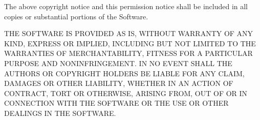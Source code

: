 The above copyright notice and this permission notice shall be included in all copies or substantial portions of the Software.

T\+HE S\+O\+F\+T\+W\+A\+RE IS P\+R\+O\+V\+I\+D\+ED \textquotesingle{}AS IS\textquotesingle{}, W\+I\+T\+H\+O\+UT W\+A\+R\+R\+A\+N\+TY OF A\+NY K\+I\+ND, E\+X\+P\+R\+E\+SS OR I\+M\+P\+L\+I\+ED, I\+N\+C\+L\+U\+D\+I\+NG B\+UT N\+OT L\+I\+M\+I\+T\+ED TO T\+HE W\+A\+R\+R\+A\+N\+T\+I\+ES OF M\+E\+R\+C\+H\+A\+N\+T\+A\+B\+I\+L\+I\+TY, F\+I\+T\+N\+E\+SS F\+OR A P\+A\+R\+T\+I\+C\+U\+L\+AR P\+U\+R\+P\+O\+SE A\+ND N\+O\+N\+I\+N\+F\+R\+I\+N\+G\+E\+M\+E\+NT. IN NO E\+V\+E\+NT S\+H\+A\+LL T\+HE A\+U\+T\+H\+O\+RS OR C\+O\+P\+Y\+R\+I\+G\+HT H\+O\+L\+D\+E\+RS BE L\+I\+A\+B\+LE F\+OR A\+NY C\+L\+A\+IM, D\+A\+M\+A\+G\+ES OR O\+T\+H\+ER L\+I\+A\+B\+I\+L\+I\+TY, W\+H\+E\+T\+H\+ER IN AN A\+C\+T\+I\+ON OF C\+O\+N\+T\+R\+A\+CT, T\+O\+RT OR O\+T\+H\+E\+R\+W\+I\+SE, A\+R\+I\+S\+I\+NG F\+R\+OM, O\+UT OF OR IN C\+O\+N\+N\+E\+C\+T\+I\+ON W\+I\+TH T\+HE S\+O\+F\+T\+W\+A\+RE OR T\+HE U\+SE OR O\+T\+H\+ER D\+E\+A\+L\+I\+N\+GS IN T\+HE S\+O\+F\+T\+W\+A\+RE. 
